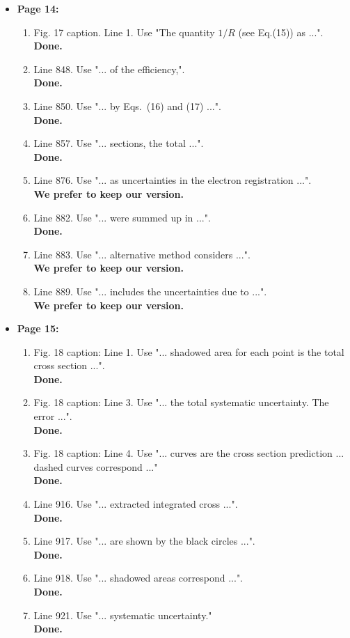 \documentclass[,superscriptaddress,showpacs,amssymb,amsmath,amsfonts,linenumbers,article]{revtex4-1}
\begin{document}
\begin{itemize}
\begin{enumerate}
\end{enumerate} 


\item {\bf \large  Page 14:}
\begin{enumerate}

\item Fig. 17 caption. Line 1. Use "The quantity $1/R$ (see Eq.(15)) as ...".\\
{\bf Done.}
\item Line 848. Use "... of the efficiency,".\\
{\bf Done.}
\item Line 850. Use "... by Eqs.~(16) and (17) ...".\\
{\bf Done.}
\item Line 857. Use "... sections, the total ...".\\
{\bf Done.}
\item Line 876. Use "... as uncertainties in the electron registration ...".\\
{\bf We prefer to keep our version.}
\item Line 882. Use "... were summed up in ...".\\
{\bf Done.}
\item Line 883. Use "... alternative method considers ...".\\
{\bf We prefer to keep our version.}
\item Line 889. Use "... includes the uncertainties due to ...".\\
{\bf We prefer to keep our version.}

\end{enumerate} 


\item {\bf \large  Page 15:}
\begin{enumerate}

\item Fig. 18 caption: Line 1. Use "... shadowed area for each point is the total cross section ...".\\
{\bf Done.}
\item Fig. 18 caption: Line 3. Use "... the total systematic uncertainty. The error ...".\\
{\bf Done.}
\item Fig. 18 caption: Line 4. Use "... curves are the cross section prediction ... dashed curves  correspond ..."\\
{\bf Done.}
\item Line 916. Use "... extracted integrated cross ...".\\
{\bf Done.}
\item Line 917. Use "... are shown by the black circles ...".\\
{\bf Done.}
\item Line 918. Use "... shadowed areas correspond ...".\\
{\bf Done.}
\item Line 921. Use "... systematic uncertainty."\\
{\bf Done.}


\end{enumerate}
\end{itemize}
\end{document}
